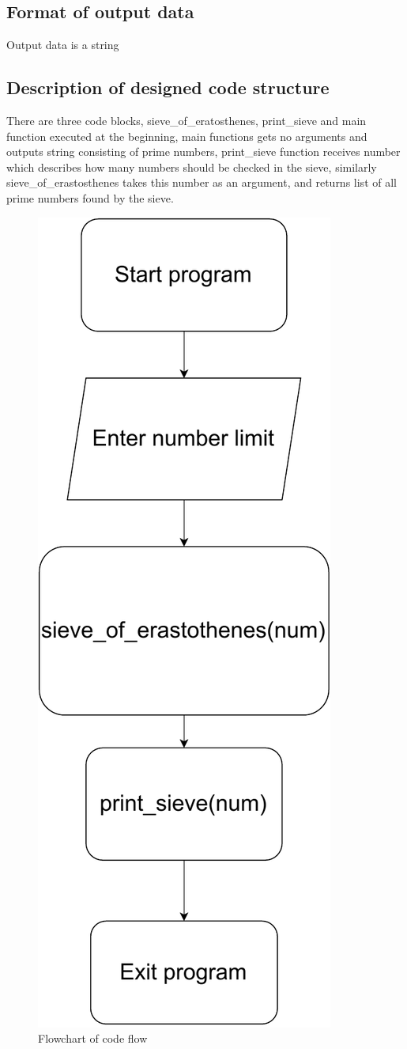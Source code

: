 \documentclass[12pt]{article}
\begin{document}
\subsection{Format of output data}
Output data is a string
\subsection{Description of designed code structure}
There are three code blocks, sieve\_of\_eratosthenes, print\_sieve and main function executed at the beginning, main functions gets no arguments and outputs string consisting of prime numbers, print\_sieve function receives number which describes how many numbers should be checked in the sieve, similarly sieve\_of\_erastosthenes takes this number as an argument, and returns list of all prime numbers found by the sieve.

\begin{figure}[H]
\centering
\includegraphics[height=\textwidth]
{screenshoot/code_structure.pdf}
\caption{Flowchart of code flow }

\end{figure}
\end{document}
